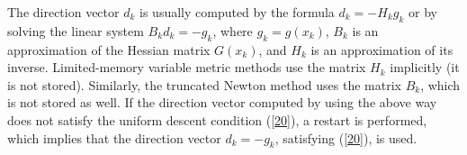 \documentclass{esub2acm}
\begin{document}
The direction vector $d_k$ is usually computed by the formula
$d_k = - H_k g_k$ or by solving the linear system $B_k d_k =-g_k$,
where $g_k = g(x_k)$, $B_k$ is an approximation of the Hessian
matrix $G(x_k)$, and $H_k$ is an approximation of its inverse.
Limited-memory variable metric methods use the matrix $H_k$
implicitly (it is not stored). Similarly, the truncated Newton
method uses the matrix $B_k$, which is not stored as well. If
the direction vector computed by using the above way does not
satisfy the uniform descent condition (\ref{20}), a restart is
performed, which implies that the direction vector $d_k = - g_k$,
satisfying (\ref{20}), is used.

\vspace{5mm}


\vspace{3mm}
\end{document}

